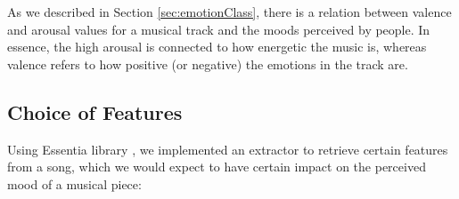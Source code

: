As we described in Section \ref{sec:emotionClass}, there is a relation between valence and arousal values for a musical track and the moods perceived by people. In essence, the high arousal is connected to how energetic the music is, whereas valence refers to how positive (or negative) the emotions in the track are. 

\vspace{10pt}

\subsection{Choice of Features}
Using Essentia library \cite{essentia}, we implemented an extractor to retrieve certain features from a song, which we would expect to have certain impact on the perceived mood of a musical piece:

